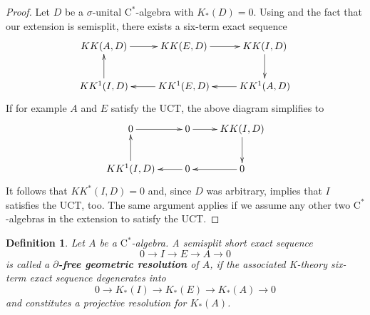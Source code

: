 \documentclass[a4paper,10pt]{amsart}
\newcommand{\cstar}{\ensuremath{\mathrm C^\ast}}
\newcounter{theorem}
\newtheorem{defn}[theorem]{Definition}
\numberwithin{equation}{section}
\numberwithin{theorem}{section}
\begin{document}
\begin{proof}
	 Let $D$ be a $\sigma$-unital $\cstar$-algebra with $K_*(D) = 0$. Using \cite[Theorem 19.5.7]{Blackadar:KBook} and the fact that our extension is semisplit, there exists a six-term exact sequence
	 \[
	 	\xymatrix{
	 		KK(A,D) \ar[r] & KK(E,D) \ar[r] & KK(I,D) \ar[d] \\
	 		KK^1(I,D) \ar[u] &  KK^1(E,D) \ar[l] & KK^1(A,D) \ar[l]
	 	}
	 \]
	 If for example $A$ and $E$ satisfy the UCT, the above diagram simplifies to 
	  \[
	 	\xymatrix{
	 		0 \ar[r] & 0 \ar[r] & KK(I,D) \ar[d] \\
	 		KK^1(I,D) \ar[u] &  0 \ar[l] & 0 \ar[l]
	 	}
	 \]
	 It follows that $KK^*(I,D) = 0$ and, since $D$ was arbitrary, \cite[23.10.5 (iv)$\Rightarrow$(i)]{Blackadar:KBook} implies that $I$ satisfies the UCT, too. The same argument applies if we assume any other two $\cstar$-algebras in the extension to satisfy the UCT. 
\end{proof}

\begin{defn}
\label{def:geores}
	Let $A$ be a  $\cstar$-algebra. A semisplit short exact sequence 
	\[
		0 \to I \to E \to A \to 0
	\]
	is called a {\bf $\partial$-free geometric resolution} of $A$, if the associated K-theory six-term exact sequence degenerates into
	\[
		0 \to K_*(I) \to K_*(E) \to K_*(A) \to 0
	\]
	and constitutes a projective resolution for $K_*(A)$.
\end{defn}
\end{document}
